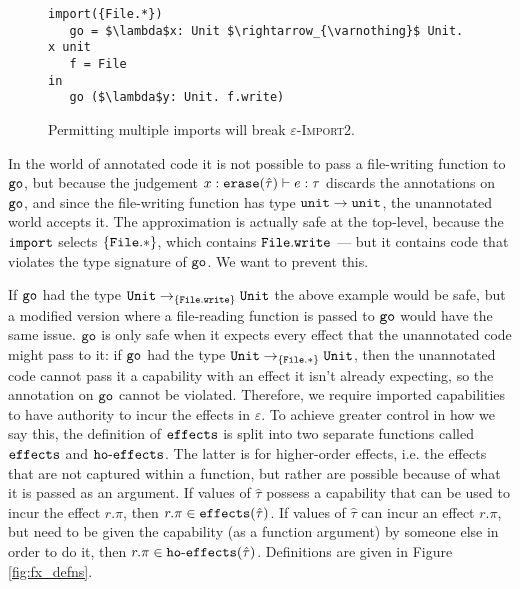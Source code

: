 \begin{figure}[h]

\begin{lstlisting}
import({File.*})
   go = $\lambda$x: Unit $\rightarrow_{\varnothing}$ Unit. x unit
   f = File
in
   go ($\lambda$y: Unit. f.write)

\end{lstlisting}

\vspace{-7pt}
\caption{Permitting multiple imports will break \textsc{$\varepsilon$-Import2}.}
\label{fig:rule_import2_counterexample}
\end{figure}

In the world of annotated code it is not possible to pass a
file-writing function to $\mathtt{go}$, but because the judgement
$x: \mathtt{erase}(\hat \tau) \vdash e: \tau$ discards the annotations on
$\mathtt{go}$, and since the file-writing function has type
$\mathtt{unit} \rightarrow \mathtt{unit}$, the unannotated world accepts it. The
approximation is actually safe at the top-level, because the
$\mathtt{import}$ selects $\{ \mathtt{File.*} \}$, which contains
$\mathtt{File.write}$ --- but it contains code that violates the type
signature of $\mathtt{go}$. We want to prevent this.

If $\mathtt{go}$ had the type
$\mathtt{Unit} \rightarrow_{\{ \mathtt{File.write} \}} \mathtt{Unit}$ the above example
would be safe, but a modified version where a file-reading function is
passed to $\mathtt{go}$ would have the same issue. $\mathtt{go}$ is only
safe when it expects every effect that the unannotated code might pass
to it: if $\mathtt{go}$ had the type
$\mathtt{Unit} \rightarrow_{\{ \mathtt{File.*} \}} \mathtt{Unit}$, then the unannotated
code cannot pass it a capability with an effect it isn't already
expecting, so the annotation on $\mathtt{go}$ cannot be
violated. Therefore, we require imported capabilities to have
authority to incur the effects in $\varepsilon$. To achieve greater
control in how we say this, the definition of $\mathtt{effects}$ is split
into two separate functions called $\mathtt{effects}$ and
$\mathtt{ho \hbox{-} effects}$. The latter is for higher-order effects,
i.e. the effects that are not captured within a function, but rather
are possible because of what it is passed as an argument. If values of
$\hat \tau$ possess a capability that can be used to incur the effect
$r.\pi$, then $r.\pi \in \mathtt{effects}(\hat \tau)$. If values of $\hat \tau$ can
incur an effect $r.\pi$, but need to be given the capability (as a
function argument) by someone else in order to do it, then
$r.\pi \in \mathtt{ho \hbox{-} effects}(\hat \tau)$. Definitions are given in Figure
\ref{fig:fx_defns}.

